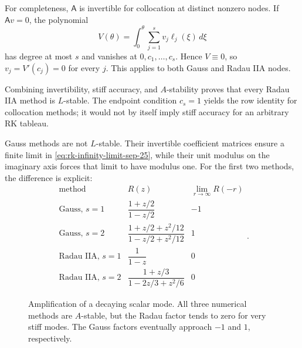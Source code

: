 For completeness, \(\mathsf A\) is invertible for collocation at
distinct nonzero nodes. If \(\mathsf A v=0\), the polynomial
\[
 V(\theta)=\int_0^\theta\sum_{j=1}^s v_j\ell_j(\xi)\,d\xi
\]
has degree at most \(s\) and vanishes at \(0,c_1,\ldots,c_s\).
Hence \(V\equiv0\), so \(v_j=V'(c_j)=0\) for every \(j\).
This applies to both Gauss and Radau IIA nodes.

Combining invertibility, stiff accuracy, and \(A\)-stability proves
that every Radau IIA method is \(L\)-stable. The endpoint condition
\(c_s=1\) yields the row identity for collocation methods; it would
not by itself imply stiff accuracy for an arbitrary RK tableau.

Gauss methods are not \(L\)-stable. Their invertible coefficient
matrices ensure a finite limit in
\eqref{eq:rk-infinity-limit-sep-25}, while their unit modulus on the
imaginary axis forces that limit to have modulus one. For the first
two methods, the difference is explicit:
\[
 \begin{array}{c|c|c}
  \text{method}&R(z)&\displaystyle\lim_{r\to\infty}R(-r)\\ \hline
  \text{Gauss, }s=1&\dfrac{1+z/2}{1-z/2}&-1\\[8pt]
  \text{Gauss, }s=2&\dfrac{1+z/2+z^2/12}{1-z/2+z^2/12}&1\\[8pt]
  \text{Radau IIA, }s=1&\dfrac1{1-z}&0\\[8pt]
  \text{Radau IIA, }s=2&\dfrac{1+z/3}{1-2z/3+z^2/6}&0
 \end{array}.
\]

\begin{figure}[htbp]
\centering
{}
\caption{Amplification of a decaying scalar mode. All three numerical
methods are \(A\)-stable, but the Radau factor tends to zero for
very stiff modes. The Gauss factors eventually approach \(-1\) and
\(1\), respectively.}
\end{figure}
